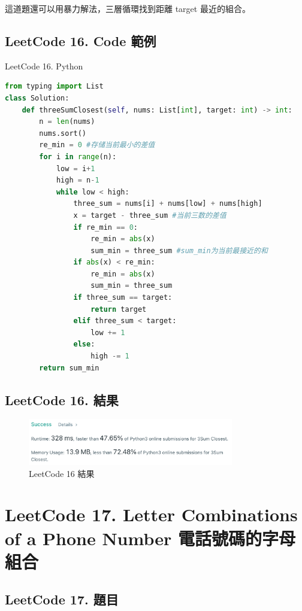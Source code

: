 \documentclass[10pt,UTF8]{ctexart}
\begin{document}
這道題還可以用暴力解法，三層循環找到距離 target 最近的組合。

\subsection{LeetCode 16. Code 範例}

LeetCode 16. Python 

\begin{lstlisting}[language={python}]
from typing import List
class Solution:
    def threeSumClosest(self, nums: List[int], target: int) -> int:
        n = len(nums)
        nums.sort()
        re_min = 0 #存储当前最小的差值
        for i in range(n):
            low = i+1
            high = n-1
            while low < high:
                three_sum = nums[i] + nums[low] + nums[high]
                x = target - three_sum #当前三数的差值
                if re_min == 0:
                    re_min = abs(x)
                    sum_min = three_sum #sum_min为当前最接近的和
                if abs(x) < re_min:
                    re_min = abs(x)
                    sum_min = three_sum
                if three_sum == target:
                    return target
                elif three_sum < target:
                    low += 1
                else:
                    high -= 1
        return sum_min
\end{lstlisting}

\subsection{LeetCode 16. 結果}

\begin{figure}[H]
\centering 
\includegraphics[width=0.80\textwidth]{lc-16-o.png} 
\caption{LeetCode 16 結果}
\label{Test}
\end{figure}


\newpage

\section{LeetCode 17. Letter Combinations of a Phone Number 電話號碼的字母組合}

\subsection{LeetCode 17. 題目}
\end{document}
